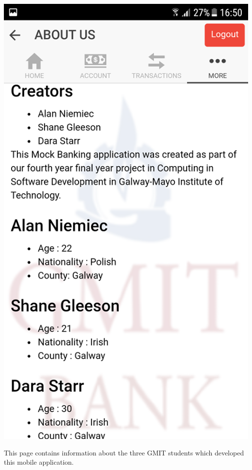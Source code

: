 \begin{center}    
    \includegraphics[scale=0.5]{img/17moredetails.png}
\end{center}
This page contains information about the three GMIT students which developed this mobile application.\paragraph{}
